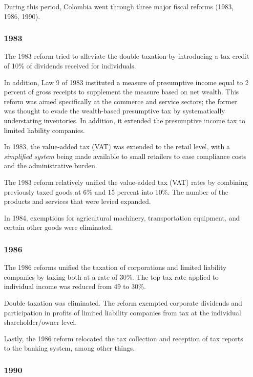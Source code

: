 \documentclass[
  12pt]{article}
\begin{document}
During this period, Colombia went through three major fiscal reforms
(1983, 1986, 1990).

\subsubsection{1983}\label{section}

The 1983 reform tried to alleviate the double taxation by introducing a
tax credit of 10\% of dividends received for individuals.

In addition, Law 9 of 1983 instituted a measure of presumptive income
equal to 2 percent of gross receipts to supplement the measure based on
net wealth. This reform was aimed specifically at the commerce and
service sectors; the former was thought to evade the wealth-based
presumptive tax by systematically understating inventories. In addition,
it extended the presumptive income tax to limited liability companies.

In 1983, the value-added tax (VAT) was extended to the retail level,
with a \emph{simplified system} being made available to small retailers
to ease compliance costs and the administrative burden.

The 1983 reform relatively unified the value-added tax (VAT) rates by
combining previously taxed goods at 6\% and 15 percent into 10\%. The
number of the products and services that were levied expanded.

In 1984, exemptions for agricultural machinery, transportation
equipment, and certain other goods were eliminated.

\subsubsection{1986}\label{section-1}

The 1986 reforms unified the taxation of corporations and limited
liability companies by taxing both at a rate of 30\%. The top tax rate
applied to individual income was reduced from 49 to 30\%.

Double taxation was eliminated. The reform exempted corporate dividends
and participation in profits of limited liability companies from tax at
the individual shareholder/owner level.

Lastly, the 1986 reform relocated the tax collection and reception of
tax reports to the banking system, among other things.

\subsubsection{1990}\label{section-2}
\end{document}
